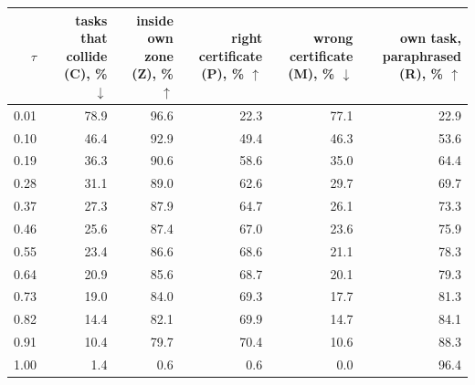 \begin{tabular}{rrrrrr}
    \toprule
    $\tau$ & \shortstack[r]{tasks that\\collide\\(\textsf{C}), \% $\downarrow$} & \shortstack[r]{inside own\\zone\\(\textsf{Z}), \% $\uparrow$} & \shortstack[r]{right\\certificate\\(\textsf{P}), \% $\uparrow$} & \shortstack[r]{wrong\\certificate\\(\textsf{M}), \% $\downarrow$} & \shortstack[r]{own task,\\paraphrased\\(\textsf{R}), \% $\uparrow$} \\
    \midrule
    0.01 & 78.9 & 96.6 & 22.3 & 77.1 & 22.9 \\
    0.10 & 46.4 & 92.9 & 49.4 & 46.3 & 53.6 \\
    0.19 & 36.3 & 90.6 & 58.6 & 35.0 & 64.4 \\
    0.28 & 31.1 & 89.0 & 62.6 & 29.7 & 69.7 \\
    0.37 & 27.3 & 87.9 & 64.7 & 26.1 & 73.3 \\
    0.46 & 25.6 & 87.4 & 67.0 & 23.6 & 75.9 \\
    0.55 & 23.4 & 86.6 & 68.6 & 21.1 & 78.3 \\
    0.64 & 20.9 & 85.6 & 68.7 & 20.1 & 79.3 \\
    0.73 & 19.0 & 84.0 & 69.3 & 17.7 & 81.3 \\
    0.82 & 14.4 & 82.1 & 69.9 & 14.7 & 84.1 \\
    0.91 & 10.4 & 79.7 & 70.4 & 10.6 & 88.3 \\
    1.00 & 1.4 & 0.6 & 0.6 & 0.0 & 96.4 \\
    \bottomrule
\end{tabular}
